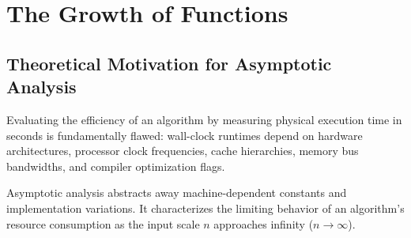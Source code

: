 \documentclass[10pt,a4paper]{article}
\theoremstyle{definition}
\begin{document}
\begin{table}[htbp]
\centering
\small
\caption{Systematic Comparison of Major Algorithmic Design Paradigms}
\label{tab:paradigms}
\vspace{2pt}
\end{table}

\section{The Growth of Functions}

\subsection{Theoretical Motivation for Asymptotic Analysis}
Evaluating the efficiency of an algorithm by measuring physical execution time in seconds is fundamentally flawed: wall-clock runtimes depend on hardware architectures, processor clock frequencies, cache hierarchies, memory bus bandwidths, and compiler optimization flags. 

Asymptotic analysis abstracts away machine-dependent constants and implementation variations. It characterizes the limiting behavior of an algorithm's resource consumption as the input scale $n$ approaches infinity ($n \to \infty$).
\end{document}
